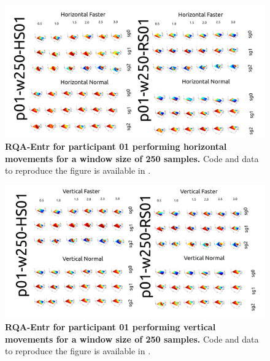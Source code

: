\documentclass[12pt]{article}
\begin{document}
\newpage
\begin{figure}[ht!]
\centering
\includegraphics{figures/rqa/output/epsilons/rqa-epsilonsp01w250Horizontal}
    	\caption{
	{\bf RQA-Entr for participant 01 performing horizontal movements for a window size of 250 samples.}
	Code and data to reproduce the figure is available in \cite{srep2021}.
        }
    \label{fig-p01-H-w250}
\end{figure}
\begin{figure}[hb!]
\centering
\includegraphics{figures/rqa/output/epsilons/rqa-epsilonsp01w250Vertical}
    	\caption{
	{\bf RQA-Entr for participant 01 performing vertical movements for a window size of 250 samples.}
	Code and data to reproduce the figure is available in \cite{srep2021}.
        }
    \label{fig-p01-V-w250}
\end{figure}
\end{document}

